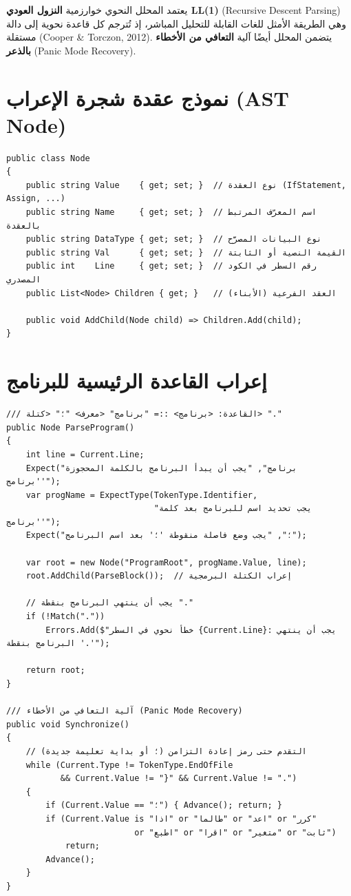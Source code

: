 \documentclass[12pt,a4paper]{report}
\newcommand{\filename}[1]{\textcolor{SecondaryBlue}{\texttt{#1}}}
\begin{document}
يعتمد المحلل النحوي خوارزمية \textbf{النزول العودي LL(1)} (Recursive Descent Parsing) وهي الطريقة الأمثل للغات القابلة للتحليل المباشر، إذ تُترجم كل قاعدة نحوية إلى دالة مستقلة (Cooper \& Torczon, 2012). يتضمن المحلل أيضًا آلية \textbf{التعافي من الأخطاء بالذعر} (Panic Mode Recovery).

\section{نموذج عقدة شجرة الإعراب (AST Node)}

\begin{CodeBox}[title={\filename{Node.cs} — عقدة شجرة الإعراب المجردة}]
\begin{lstlisting}[style=CSharpStyle]
public class Node
{
    public string Value    { get; set; }  // نوع العقدة (IfStatement, Assign, ...)
    public string Name     { get; set; }  // اسم المعرّف المرتبط بالعقدة
    public string DataType { get; set; }  // نوع البيانات المصرَّح
    public string Val      { get; set; }  // القيمة النصية أو الثابتة
    public int    Line     { get; set; }  // رقم السطر في الكود المصدري
    public List<Node> Children { get; }   // العقد الفرعية (الأبناء)

    public void AddChild(Node child) => Children.Add(child);
}
\end{lstlisting}
\end{CodeBox}

\section{إعراب القاعدة الرئيسية للبرنامج}

\begin{CodeBox}[title={\filename{Parser.cs} — إعراب الكتلة البرمجية الرئيسية}]
\begin{lstlisting}[style=CSharpStyle]
/// القاعدة: <برنامج> ::= "برنامج" <معرف> "؛" <كتلة> "."
public Node ParseProgram()
{
    int line = Current.Line;
    Expect("برنامج", "يجب أن يبدأ البرنامج بالكلمة المحجوزة 'برنامج'");
    var progName = ExpectType(TokenType.Identifier,
                              "يجب تحديد اسم للبرنامج بعد كلمة 'برنامج'");
    Expect("؛", "يجب وضع فاصلة منقوطة '؛' بعد اسم البرنامج");

    var root = new Node("ProgramRoot", progName.Value, line);
    root.AddChild(ParseBlock());  // إعراب الكتلة البرمجية

    // يجب أن ينتهي البرنامج بنقطة "."
    if (!Match("."))
        Errors.Add($"خطأ نحوي في السطر {Current.Line}: يجب أن ينتهي البرنامج بنقطة '.'");

    return root;
}

/// آلية التعافي من الأخطاء (Panic Mode Recovery)
public void Synchronize()
{
    // التقدم حتى رمز إعادة التزامن (؛ أو بداية تعليمة جديدة)
    while (Current.Type != TokenType.EndOfFile
           && Current.Value != "}" && Current.Value != ".")
    {
        if (Current.Value == "؛") { Advance(); return; }
        if (Current.Value is "اذا" or "طالما" or "اعد" or "كرر"
                          or "اطبع" or "اقرا" or "متغير" or "ثابت")
            return;
        Advance();
    }
}
\end{lstlisting}
\end{CodeBox}
\end{document}
